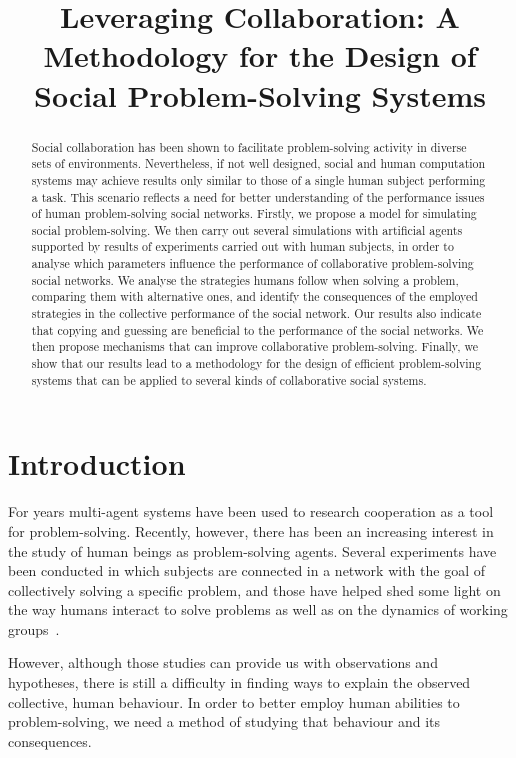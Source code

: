 \documentclass{article}
\title{Leveraging Collaboration: 
A Methodology for the Design of Social Problem-Solving Systems}
\begin{document}
\maketitle

\begin{abstract}
Social collaboration has been shown to facilitate problem-solving activity in diverse sets of environments. 
Nevertheless, if not well designed, social and human computation systems may achieve results 
only similar to those of a single human subject performing a task. 
This scenario reflects a need for better understanding of the performance 
issues of human problem-solving social networks. 
Firstly, we propose a model for simulating social problem-solving. 
We then carry out several simulations with artificial agents  
supported by results of experiments carried out with human subjects, 
in order to analyse which parameters influence the performance of collaborative problem-solving social networks. 
We analyse the strategies humans follow when solving a problem, 
comparing them with alternative ones, and 
identify the consequences of the employed strategies 
in the collective performance of the social network. 
Our results also indicate that copying and guessing are beneficial to the 
performance of the social networks. 
We then propose mechanisms that can improve 
collaborative problem-solving.
Finally, we show that our results lead to a methodology for the design  
of efficient problem-solving systems that can be applied 
to several kinds of collaborative social systems. 

\end{abstract}

\section{Introduction}

For years multi-agent systems have been used to research cooperation as a tool for problem-solving. %
Recently, however, there has been an increasing interest in the study of human beings as problem-solving agents. Several experiments have been conducted in which subjects are connected in a network with the goal of collectively solving a specific problem, and those have helped shed some light on the way humans interact to solve problems as well as on the dynamics of working groups~\cite{woolley:evidencecollective}.

However, although those studies can provide us with observations and hypotheses, there is still a difficulty in finding ways to explain the observed collective, human behaviour. In order to better employ human abilities to problem-solving, we need a method of studying that behaviour and its consequences.
\end{document}
